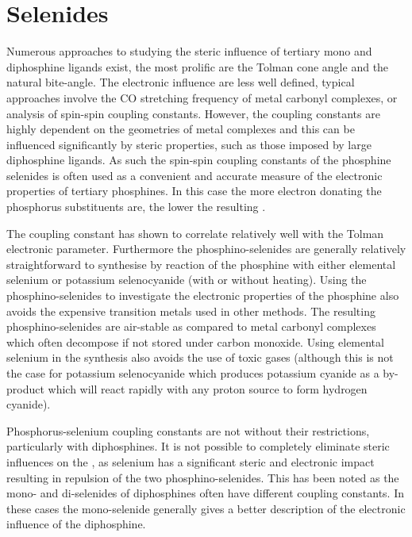 {\section{Selenides}
\label{section:selenides}

Numerous approaches to studying the steric influence of tertiary mono and diphosphine ligands exist, the most prolific are the Tolman cone angle\cite{Tolman1977} and the natural bite-angle\cite{Casey1990}.  The electronic influence are less well defined, typical approaches involve the CO stretching frequency of metal carbonyl complexes, or analysis of \oneJPM{} spin-spin coupling constants.  However, the coupling constants are highly dependent on the geometries of metal complexes and this can be influenced significantly by steric properties, such as those imposed by large diphosphine ligands.  As such the \JPSe{} spin-spin coupling constants of the phosphine selenides is often used as a convenient and accurate measure of the electronic properties of tertiary phosphines.\cite{Beckmann2011} In this case the more electron donating the phosphorus substituents are, the lower the resulting \JPSe{}.  

The \JPSe{} coupling constant has shown to correlate relatively well with the Tolman electronic parameter.\cite{Allman1982}  Furthermore the phosphino-selenides are generally relatively straightforward to synthesise by reaction of the phosphine with either elemental selenium or potassium selenocyanide (with or without heating).\cite{Beckmann2011}  Using the phosphino-selenides to investigate the electronic properties of the phosphine also avoids the expensive transition metals used in other methods.  The resulting phosphino-selenides are air-stable as compared to metal carbonyl complexes which often decompose if not stored under carbon monoxide.   Using elemental selenium in the synthesis also avoids the use of toxic gases (although this is not the case for potassium selenocyanide which produces potassium cyanide as a by-product which will react rapidly with any proton source to form hydrogen cyanide).  

Phosphorus-selenium coupling constants are not without their restrictions, particularly with diphosphines.  It is not possible to completely eliminate steric influences on the \JPSe{}, as selenium has a significant steric and electronic impact resulting in repulsion of the two phosphino-selenides.  This has been noted as the mono- and di-selenides of diphosphines often have different coupling constants.  In these cases the mono-selenide generally gives a better description of the electronic influence of the diphosphine.  

}
